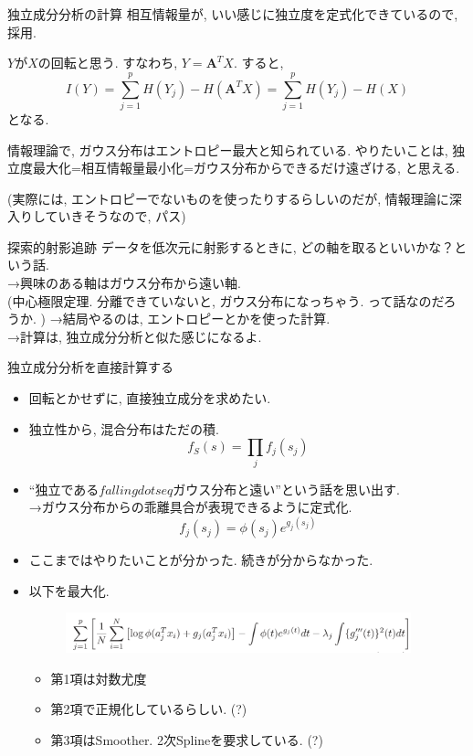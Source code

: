 \documentclass[dvipdfmx,8pt]{beamer}
\begin{document}
  \begin{frame}{独立成分分析の計算}
    相互情報量が, いい感じに独立度を定式化できているので, 採用.

    $Y$が$X$の回転と思う. すなわち, $Y=\textbf{A}^TX$.
    すると,
    \[
      I(Y)=\sum_{j=1}^pH(Y_j)-H(\textbf{A}^TX)=\sum_{j=1}^pH(Y_j)-H(X)
    \]
    となる.

    情報理論で, ガウス分布はエントロピー最大と知られている.
    やりたいことは, 独立度最大化=相互情報量最小化=ガウス分布からできるだけ遠ざける, と思える.

    (実際には, エントロピーでないものを使ったりするらしいのだが, 情報理論に深入りしていきそうなので, パス)
  \end{frame}
  \begin{frame}{探索的射影追跡}
    データを低次元に射影するときに, どの軸を取るといいかな？という話.\\
    →興味のある軸はガウス分布から遠い軸.\\
    (中心極限定理. 分離できていないと, ガウス分布になっちゃう. って話なのだろうか. )
    →結局やるのは, エントロピーとかを使った計算.\\
    →計算は, 独立成分分析と似た感じになるよ.

  \end{frame}
  \begin{frame}{独立成分分析を直接計算する}
    \begin{itemize}
      \item 回転とかせずに, 直接独立成分を求めたい.
      \item 独立性から, 混合分布はただの積.
        \[
          f_S(s)=\prod_jf_j(s_j)
        \]
      \item ``独立である$fallingdotseq$ガウス分布と遠い''という話を思い出す.\\
        →ガウス分布からの乖離具合が表現できるように定式化.
        \[
          f_j(s_j)=\phi(s_j)e^{g_j(s_j)}
        \]
      \item ここまではやりたいことが分かった. 続きが分からなかった.
      \item 以下を最大化.
        \begin{figure}[htb]
          \centering
          \includegraphics[width=10cm,clip]{images/prodenica.png}
        \end{figure}
        \begin{itemize}
          \item 第1項は対数尤度
          \item 第2項で正規化しているらしい. (?)
          \item 第3項はSmoother. 2次Splineを要求している. (?)
        \end{itemize}
    \end{itemize}
  \end{frame}
\end{document}
